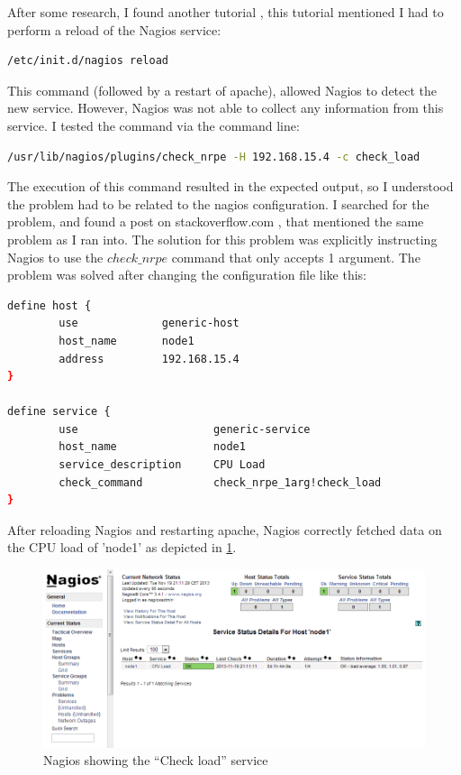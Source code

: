 \documentclass[12pt]{report}
\begin{document}
After some research, I found another tutorial
\cite{nrpe_config_tutorial},
this tutorial mentioned I had to perform a reload of the Nagios
service:
\begin{lstlisting}[language=bash]
  /etc/init.d/nagios reload 
\end{lstlisting} 
This command (followed by a restart of apache), allowed Nagios to
detect the new service.
However, Nagios was not able to collect any information from this
service. I tested the command via the command line:
\begin{lstlisting}[language=bash]
  /usr/lib/nagios/plugins/check_nrpe -H 192.168.15.4 -c check_load
\end{lstlisting} 
The execution of this command resulted in the expected output, 
so I understood the problem had to be related to the nagios
configuration.
I searched for the problem, and found a post on stackoverflow.com
\cite{stackoverflow_nagios},
that mentioned the same problem as I ran into. 
The solution for this problem was explicitly instructing Nagios to
use the $check\_nrpe$ command that only accepts 1 argument.
The problem was solved after changing the configuration file like this:
\begin{lstlisting}[language=bash]
define host {
        use             generic-host
        host_name       node1
        address         192.168.15.4
}

define service {
        use                     generic-service
        host_name               node1
        service_description     CPU Load
        check_command           check_nrpe_1arg!check_load
}
\end{lstlisting}
After reloading Nagios and restarting apache, Nagios correctly fetched data
on the CPU load of 'node1' as depicted in
\cref{fig:nagios_nrpe_working_check_load}.

\begin{figure}[h!]
  \caption{Nagios showing the ``Check load'' service}
  \label{fig:nagios_nrpe_working_check_load}
  \centering
    \includegraphics[scale=0.3]{pics/nagios_2.png}
\end{figure}
\end{document}
